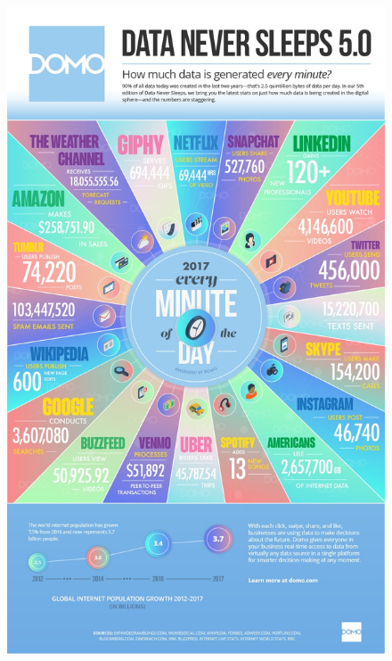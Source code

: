\documentclass[12pt]{book}\usepackage{knitr}
\begin{document}
\begin{figure}
 \centering
    \includegraphics[width = 13 cm]{./viz/ext/dataeachday2017.jpg}
\end{figure}

\newpage
\end{document}
